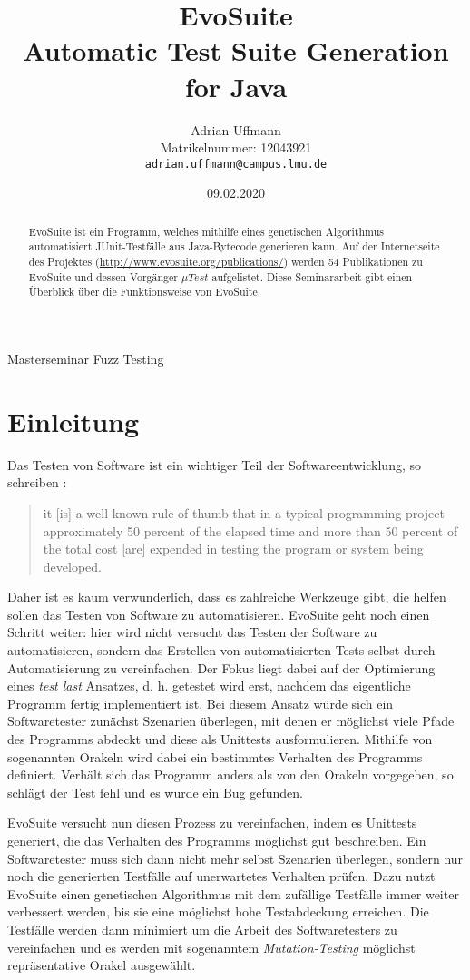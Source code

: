 \documentclass[a4paper,11pt]{article}
\title{\textbf{EvoSuite}\\
Automatic Test Suite Generation for Java}
\author{Adrian Uffmann\\
Matrikelnummer: 12043921\\
\texttt{adrian.uffmann@campus.lmu.de}}
\date{09.02.2020}
\begin{document}
\maketitle

\begin{center}
Masterseminar Fuzz Testing
\end{center}

\begin{abstract}
EvoSuite ist ein Programm, welches mithilfe eines genetischen Algorithmus automatisiert JUnit-Testfälle aus Java-Bytecode generieren kann.
Auf der Internetseite des Projektes (\url{http://www.evosuite.org/publications/}) werden 54 Publikationen zu EvoSuite und dessen Vorgänger ${\mu}Test$ aufgelistet.
Diese Seminararbeit gibt einen Überblick über die Funktionsweise von EvoSuite.
\end{abstract}

\section{Einleitung}

Das Testen von Software ist ein wichtiger Teil der Softwareentwicklung, so schreiben \citet{myers2004art}:
\begin{quote}
it [is] a well-known rule of thumb that in a typical programming project approximately 50 percent of the elapsed time and more than 50 percent of the total cost [are] expended in testing the program or system being developed.
\end{quote}
Daher ist es kaum verwunderlich, dass es zahlreiche Werkzeuge gibt, die helfen sollen das Testen von Software zu automatisieren.
EvoSuite geht noch einen Schritt weiter: hier wird nicht versucht das Testen der Software zu automatisieren, sondern das Erstellen von automatisierten Tests selbst durch Automatisierung zu vereinfachen.
Der Fokus liegt dabei auf der Optimierung eines \textit{test last} Ansatzes, d. h. getestet wird erst, nachdem das eigentliche Programm fertig implementiert ist.
Bei diesem Ansatz würde sich ein Softwaretester zunächst Szenarien überlegen, mit denen er möglichst viele Pfade des Programms abdeckt und diese als Unittests ausformulieren.
Mithilfe von sogenannten Orakeln wird dabei ein bestimmtes Verhalten des Programms definiert.
Verhält sich das Programm anders als von den Orakeln vorgegeben, so schlägt der Test fehl und es wurde ein Bug gefunden.

EvoSuite versucht nun diesen Prozess zu vereinfachen, indem es Unittests generiert, die das Verhalten des Programms möglichst gut beschreiben.
Ein Softwaretester muss sich dann nicht mehr selbst Szenarien überlegen, sondern nur noch die generierten Testfälle auf unerwartetes Verhalten prüfen.
Dazu nutzt EvoSuite einen genetischen Algorithmus mit dem zufällige Testfälle immer weiter verbessert werden, bis sie eine möglichst hohe Testabdeckung erreichen.
Die Testfälle werden dann minimiert um die Arbeit des Softwaretesters zu vereinfachen und es werden mit sogenanntem \textit{Mutation-Testing} möglichst repräsentative Orakel ausgewählt.
\end{document}
